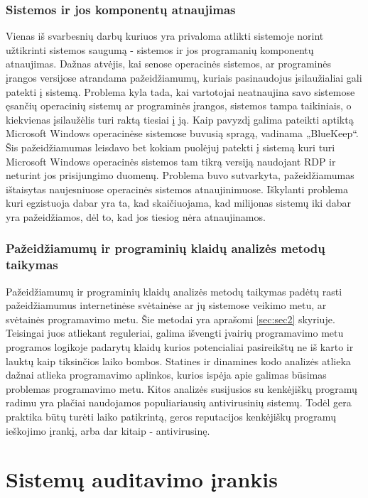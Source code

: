 \documentclass[a4paper,12pt,fleqn]{article}
\begin{document}
\subsubsection{Sistemos ir jos komponentų atnaujimas} 

Vienas iš svarbesnių darbų kuriuos yra privaloma atlikti sistemoje norint užtikrinti sistemos saugumą - sistemos ir jos programanių komponentų atnaujimas. Dažnas atvėjis, kai senose operacinės sistemos, ar programinės įrangos versijose atrandama pažeidžiamumų, kuriais pasinaudojus įsilaužialiai gali patekti į sistemą. Problema kyla tada, kai vartotojai neatnaujina savo sistemose ęsančių operacinių sistemų ar programinės įrangos, sistemos tampa taikiniais, o kiekvienas įsilaužėlis turi raktą tiesiai į ją. Kaip pavyzdį galima pateikti aptiktą Microsoft Windows operacinėse sistemose buvusią spragą, vadinama „BlueKeep“. Šis pažeidžiamumas leisdavo bet kokiam puolėjuj patekti į sistemą kuri turi Microsoft Windows operacinės sistemos tam tikrą versiją naudojant RDP ir neturint jos prisijungimo duomenų\cite{CVE-2019-0708}. Problema buvo sutvarkyta, pažeidžiamumas ištaisytas naujesniuose operacinės sistemos atnaujinimuose. Iškylanti problema kuri egzistuoja dabar yra ta, kad skaičiuojama, kad milijonas sistemų iki dabar yra pažeidžiamos, dėl to, kad jos tiesiog nėra atnaujinamos\cite{sayan2019semantic}.

\subsubsection{Pažeidžiamumų ir programinių klaidų analizės metodų taikymas}

Pažeidžiamumų ir programinių klaidų analizės metodų taikymas padėtų rasti pažeidžiamumus internetinėse svėtainėse ar jų sistemose veikimo metu, ar svėtainės programavimo metu. Šie metodai yra aprašomi \ref{sec:sec2} skyriuje. Teisingai juos atliekant reguleriai, galima išvengti įvairių programavimo metu programos logikoje padarytų klaidų kurios potencialiai pasireikštų ne iš karto ir lauktų kaip tiksinčios laiko bombos. Statines ir dinamines kodo analizės atlieka dažnai atlieka programavimo aplinkos, kurios ispėja apie galimas būsimas problemas programavimo metu. Kitos analizės susijusios su kenkėjiškų programų radimu yra plačiai naudojamos populiariausių antivirusinių sistemų. Todėl gera praktika būtų turėti laiko patikrintą, geros reputacijos kenkėjiškų programų ieškojimo įrankį, arba dar kitaip - antivirusinę.

\newpage
\section{Sistemų auditavimo įrankis}
\label{sec:motivation}
\end{document}
